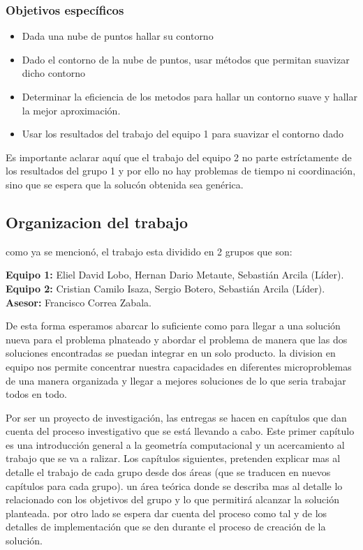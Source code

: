 \documentclass[final, 12pt letterpaper]{article}
\begin{document}
\subsubsection*{Objetivos específicos}
\begin{itemize}
\item Dada una nube de puntos hallar su contorno
\item Dado el contorno de la nube de puntos, usar métodos que permitan suavizar dicho contorno
\item Determinar la eficiencia de los metodos para hallar un contorno suave y hallar la mejor aproximación.
\item Usar los resultados del trabajo del equipo 1 para suavizar el contorno dado
\end{itemize}
 Es importante aclarar aquí que el trabajo del equipo 2 no parte estríctamente de los resultados del grupo 1 y por ello no hay problemas de tiempo ni coordinación, sino que se espera que la solucón obtenida sea genérica.

\subsection{Organizacion del trabajo}
como ya se mencionó, el trabajo esta dividido en 2 grupos que son:

\medskip
\noindent\textbf{Equipo 1:} Eliel David Lobo, 
Hernan Dario Metaute, 
Sebastián Arcila (Líder).
\linebreak 
\noindent \textbf{Equipo 2:}
Cristian Camilo Isaza,
Sergio Botero,
Sebastián Arcila (Líder).
\linebreak 
\textbf{Asesor:  }
Francisco Correa Zabala.
\medskip

De esta forma esperamos abarcar lo suficiente como para llegar a una solución nueva para el problema plnateado y abordar el problema de manera que las dos soluciones encontradas se puedan integrar en un solo producto. la division en equipo nos permite concentrar nuestra capacidades en diferentes microproblemas de una manera organizada y llegar a mejores soluciones de lo que seria trabajar todos en todo.\medskip

Por ser un proyecto de investigación, las entregas se hacen en capítulos que dan cuenta del proceso investigativo que se está llevando a cabo. Este primer capítulo es una introducción general a la geometría computacional y un acercamiento al trabajo que se va a ralizar. Los capítulos siguientes, pretenden explicar mas al detalle el trabajo de cada grupo desde dos áreas (que se traducen en nuevos capítulos para cada grupo). un área teórica donde se describa mas al detalle lo relacionado con los objetivos del grupo y lo que permitirá alcanzar la solución planteada. por otro lado se espera dar cuenta del proceso como tal y de los detalles de implementación que se den durante el proceso de creación de la solución.\medskip
\end{document}
